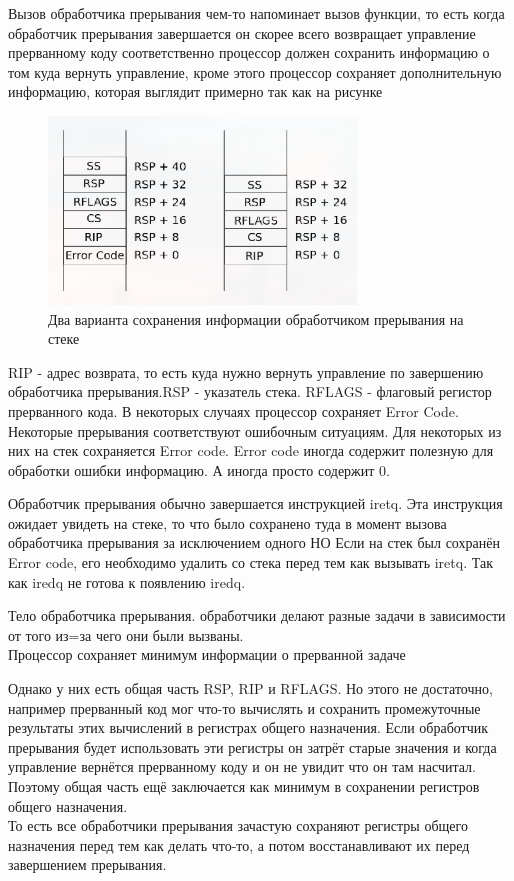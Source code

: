 	\par Вызов обработчика прерывания чем-то напоминает вызов функции, то есть когда обработчик прерывания завершается он скорее всего возвращает управление прерванному коду соответственно процессор должен сохранить информацию о том куда вернуть управление, кроме этого процессор сохраняет дополнительную информацию, которая выглядит примерно так как на рисунке

	\begin{figure}[h]
		\centering
		\includegraphics[height=5cm]{img/3.2} 
		\captionsetup{font=footnotesize} 
		\caption*{Два варианта сохранения информации обработчиком прерывания на стеке} 
	\end{figure}
	
	\par RIP - адрес возврата, то есть куда нужно вернуть управление по завершению обработчика прерывания.RSP - указатель стека. RFLAGS - флаговый регистор прерванного кода. В некоторых случаях процессор сохраняет Error Code. Некоторые прерывания соответствуют ошибочным ситуациям. Для некоторых из них на стек сохраняется Error code. Error code иногда содержит полезную для обработки ошибки информацию. А иногда просто содержит 0.
	
	\par Обработчик прерывания обычно завершается инструкцией iretq. Эта инструкция ожидает увидеть на стеке, то что было сохранено туда в момент вызова обработчика прерывания за исключением одного НО Если на стек был сохранён Error code, его необходимо удалить со стека перед тем как вызывать iretq. Так как iredq не готова к появлению iredq.
	\par Тело обработчика прерывания. обработчики делают разные задачи в зависимости от того из=за чего они были вызваны.
	\\ Процессор сохраняет минимум информации о прерванной задаче
	\par Однако у них есть общая часть RSP, RIP и RFLAGS. Но этого не достаточно, например прерванный код мог что-то вычислять и сохранить промежуточные результаты этих вычислений в регистрах общего назначения. Если обработчик прерывания будет использовать эти регистры он затрёт старые значения и когда управление вернётся прерванному коду и он не увидит что он там насчитал. Поэтому общая часть ещё заключается как минимум в сохранении регистров общего назначения. 
	\\ То есть все обработчики прерывания зачастую сохраняют регистры общего назначения перед тем как делать что-то, а потом восстанавливают их перед завершением прерывания.
	
